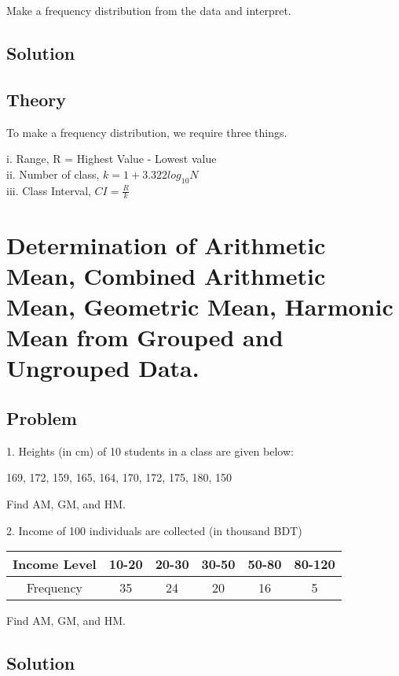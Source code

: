 \documentclass[a4paper,oneside, margin=1.4in]{book}
\begin{document}
Make a frequency distribution from the data and interpret. 

\subsection{Solution}
\subsection{Theory}

To make a frequency distribution, we require three things. 

i. Range, R = Highest Value - Lowest value \\
ii. Number of class, $k=1+3.322log_{10}N$ \\
iii. Class Interval, $CI = \frac{R}{k}$

\section{Determination of Arithmetic Mean, Combined Arithmetic Mean, Geometric Mean, Harmonic Mean from Grouped and Ungrouped Data.}

\subsection{Problem}

1. Heights (in cm) of 10 students in a class are given below:
\begin{center}
169, 172, 159, 165, 164, 170, 172, 175, 180, 150
\end{center}

Find AM, GM, and HM. 


2. Income of 100 individuals are collected (in thousand BDT)


\begin{table}[h]
\centering
\begin{tabular}{|c|c|c|c|c|c|}
\hline
Income Level & 10-20 & 20-30 & 30-50 & 50-80 & 80-120 \\ \hline
Frequency & 35 & 24 & 20 & 16 & 5 \\ \hline
\end{tabular}
\end{table}

Find AM, GM, and HM. 

\subsection{Solution}
\end{document}
